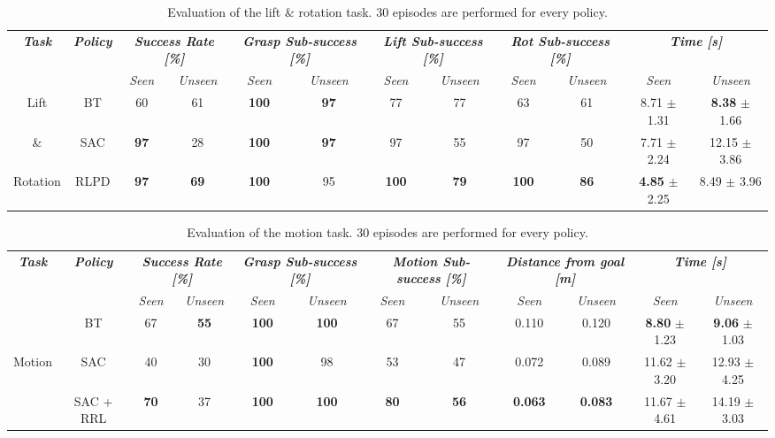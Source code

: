 \documentclass[letterpaper, 10 pt, conference]{ieeeconf}  %
\begin{document}
\begin{table}[t]
    \centering
    \caption{Evaluation of the lift \& rotation task. 30 episodes are performed for every policy.}
    \renewcommand{\arraystretch}{1.5}
    \begin{tabular}{c|c|cc|cc|cc|cc|cc}
        \toprule \textit{\textbf{Task}} & \textit{\textbf{Policy}} & \multicolumn{2}{c|}{\textit{\textbf{Success Rate [\%]}}} & \multicolumn{2}{c|}{\textit{\textbf{Grasp Sub-success [\%]}}} & \multicolumn{2}{c|}{\textit{\textbf{Lift Sub-success [\%]}}} & \multicolumn{2}{c|}{\textit{\textbf{Rot Sub-success [\%]}}} & \multicolumn{2}{c}{\textit{\textbf{Time [s]}}} \\
        & & \textit{Seen} & \textit{Unseen} & \textit{Seen} & \textit{Unseen} & \textit{Seen} & \textit{Unseen} & \textit{Seen} & \textit{Unseen} & \textit{Seen} & \textit{Unseen}\\
        \midrule 
        Lift & BT & 60 & 61 & \textbf{100} & \textbf{97} & 77 & 77 & 63 & 61 & 8.71 $\pm$ 1.31 & \textbf{8.38} $\pm$ 1.66 \\
        \& & SAC & \textbf{97} & 28 & \textbf{100} & \textbf{97} & 97 & 55 & 97 & 50 & 7.71 $\pm$ 2.24 & 12.15 $\pm$ 3.86 \\
        Rotation & RLPD & \textbf{97} & \textbf{69} & \textbf{100} & 95 & \textbf{100} & \textbf{79} & \textbf{100} & \textbf{86} & \textbf{4.85} $\pm$ 2.25 & 8.49 $\pm$ 3.96 \\
        \bottomrule
    \end{tabular}
    \label{inair_eval}
\end{table}


\begin{table}[t]
    \centering
    \scriptsize
    \caption{Evaluation of the motion task. 30 episodes are performed for every policy.}
    \renewcommand{\arraystretch}{1.5}
    \begin{tabular}{c|c|cc|cc|cc|cc|cc}
        \toprule \textit{\textbf{Task}} & \textit{\textbf{Policy}} & \multicolumn{2}{c|}{\textit{\textbf{Success Rate [\%]}}} & \multicolumn{2}{c|}{\textit{\textbf{Grasp Sub-success [\%]}}} & \multicolumn{2}{c|}{\textit{\textbf{Motion Sub-success [\%]}}} & \multicolumn{2}{c|}{\textit{\textbf{Distance from goal [m]}}} & \multicolumn{2}{c}{\textit{\textbf{Time [s]}}} \\
        & & \textit{Seen} & \textit{Unseen} & \textit{Seen} & \textit{Unseen} & \textit{Seen} & \textit{Unseen} & \textit{Seen} & \textit{Unseen} & \textit{Seen} & \textit{Unseen}\\
        \midrule & BT & 67 & \textbf{55} & \textbf{100} & \textbf{100} & 67 & 55 & 0.110 & 0.120 & \textbf{8.80} $\pm$ 1.23 & \textbf{9.06} $\pm$ 1.03 \\
        Motion & SAC & 40 & 30 & \textbf{100} & 98 & 53 & 47 & 0.072 & 0.089 & 11.62 $\pm$ 3.20 & 12.93 $\pm$ 4.25 \\
         & SAC + RRL & \textbf{70} & 37 & \textbf{100} & \textbf{100} & \textbf{80} & \textbf{56} & \textbf{0.063} & \textbf{0.083} & 11.67 $\pm$ 4.61 & 14.19 $\pm$ 3.03 \\
        \bottomrule
    \end{tabular}
    \label{motion_eval}
\end{table}
\end{document}
